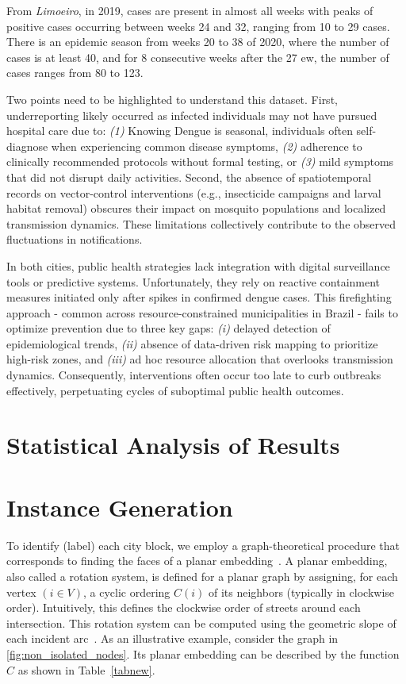 From \textit{Limoeiro}, in 2019, cases are present in almost all weeks with
peaks of positive cases occurring between weeks 24 and 32, ranging from 10 to 29
cases. There is an epidemic season from weeks 20 to 38 of 2020, where the number
of cases is at least 40, and for 8 consecutive weeks after the 27 \gls{ew}, the
number of cases ranges from 80 to 123.

Two points need to be highlighted to understand this dataset. First,
underreporting likely occurred as infected individuals may not have pursued
hospital care due to: \textit{(1)} Knowing Dengue is seasonal, individuals often
self-diagnose when experiencing common disease symptoms, \textit{(2)} adherence
to clinically recommended protocols without formal testing, or \textit{(3)} mild
symptoms that did not disrupt daily activities. Second, the absence of
spatiotemporal records on vector-control interventions (e.g., insecticide
campaigns and larval habitat removal) obscures their impact on mosquito
populations and localized transmission dynamics. These limitations collectively
contribute to the observed fluctuations in notifications.

In both cities, public health strategies lack integration with digital
surveillance tools or predictive systems. Unfortunately, they rely on reactive
containment measures initiated only after spikes in confirmed dengue cases. This
firefighting approach - common across resource-constrained municipalities in
Brazil - fails to optimize prevention due to three key gaps: \textit{(i)}
delayed detection of epidemiological trends, \textit{(ii)} absence of
data-driven risk mapping to prioritize high-risk zones, and \textit{(iii)} ad
hoc resource allocation that overlooks transmission dynamics. Consequently,
interventions often occur too late to curb outbreaks effectively, perpetuating
cycles of suboptimal public health outcomes.

\section{Statistical Analysis of Results}\label{subsec:statistical-analysis}

\section{Instance Generation}\label{sec:instance-generation}

To identify (label) each city block, we employ a graph-theoretical procedure
that corresponds to finding the faces of a planar
embedding~\citep{diestel2024graph}. A planar embedding, also called a rotation
system, is defined for a planar graph by assigning, for each vertex $( i \in V
	)$, a cyclic ordering $C(i)$ of its neighbors (typically in clockwise order).
Intuitively, this defines the clockwise order of streets around each
intersection. This rotation system can be computed using the geometric slope of
each incident arc~\citep{PhilipKleinShayMozes}. As an illustrative example,
consider the graph in \ref{fig:non_isolated_nodes}. Its planar embedding can be
described by the function $C$ as shown in Table~\ref{tabnew}.

